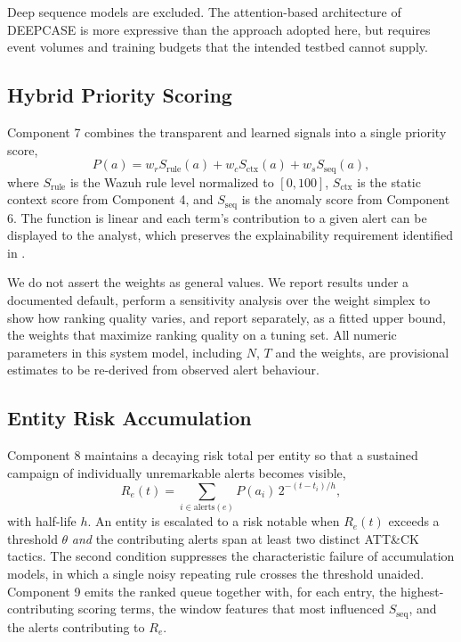 \documentclass[conference]{IEEEtran}
\begin{document}
Deep sequence models are excluded. The attention-based architecture of DEEPCASE \cite{ref15} is more expressive than the approach adopted here, but requires event volumes and training budgets that the intended testbed cannot supply.

\subsection{Hybrid Priority Scoring}

Component 7 combines the transparent and learned signals into a single priority score,
\begin{equation}
P(a) = w_r S_\mathrm{rule}(a) + w_c S_\mathrm{ctx}(a) + w_s S_\mathrm{seq}(a),
\end{equation}
where $S_\mathrm{rule}$ is the Wazuh rule level normalized to $[0,100]$, $S_\mathrm{ctx}$ is the static context score from Component 4, and $S_\mathrm{seq}$ is the anomaly score from Component 6. The function is linear and each term's contribution to a given alert can be displayed to the analyst, which preserves the explainability requirement identified in \cite{ref8}.

We do not assert the weights as general values. We report results under a documented default, perform a sensitivity analysis over the weight simplex to show how ranking quality varies, and report separately, as a fitted upper bound, the weights that maximize ranking quality on a tuning set. All numeric parameters in this system model, including $N$, $T$ and the weights, are provisional estimates to be re-derived from observed alert behaviour.

\subsection{Entity Risk Accumulation}

Component 8 maintains a decaying risk total per entity so that a sustained campaign of individually unremarkable alerts becomes visible,
\begin{equation}
R_e(t) = \sum_{i \in \mathrm{alerts}(e)} P(a_i)\, 2^{-(t - t_i)/h},
\end{equation}
with half-life $h$. An entity is escalated to a risk notable when $R_e(t)$ exceeds a threshold $\theta$ \emph{and} the contributing alerts span at least two distinct ATT\&CK tactics. The second condition suppresses the characteristic failure of accumulation models, in which a single noisy repeating rule crosses the threshold unaided. Component 9 emits the ranked queue together with, for each entry, the highest-contributing scoring terms, the window features that most influenced $S_\mathrm{seq}$, and the alerts contributing to $R_e$.
\end{document}
